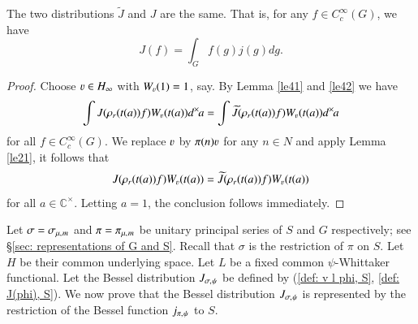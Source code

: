 \documentclass{amsproc}
\newcommand{\BC}{{\mathbb {C}}} \newcommand{\BD}{{\mathbb {D}}}
\def\BCx{\BC^{\times}}
\def\shskip{\hskip 0.5 pt}
\def\dx{d^{\times} \hskip -1 pt}
\theoremstyle{plain}
\numberwithin{equation}{section}
\begin{document}
    \begin{cor}{\label{cor53}}
		The two distributions $\widetilde J $ and $J $ are the same. That is, for any $f\in C_c^\infty(G)$, we have
\[
J (f)=\int_G f(g)j (g)dg.
\]
	\end{cor}
    \begin{proof}
    Choose $\varv\in H_\infty$ with $W_{\varv} (1) = 1$, say. %
    By Lemma \ref{le41} and   \ref{le42} we have
    \[
    \int  J (\rho_r(t(a))f)W_\varv(t(a))\dx  a=\int  \widetilde J (\rho_r(t(a))f)W_\varv(t(a))\dx  a
    \]
    for all $f\in C_c^\infty(G)$. We replace $\varv$ by $\pi(n)\varv$ for any  $n\in N$ and apply Lemma \ref{le21}, it follows that
    \[
    J (\rho_r(t(a))f)W_\varv(t(a))=\widetilde J (\rho_r(t(a))f)W_\varv(t(a))
    \]
    for all $a\in \BCx$. Letting $a = 1$, the conclusion follows immediately.
    \end{proof}

Let $\sigma=\sigma_{\mu, \shskip m}$ and $\pi=\pi_{\mu, \shskip m}$ be unitary principal series of $S$ and $G$ respectively; see \S \ref{sec: representations of G and S}. Recall that $\sigma $ is the restriction of $\pi$ on $S$. Let $H$   be their common underlying space. Let  $L$ be a fixed common $\psi$-Whittaker functional. Let  the  Bessel distribution $J_{\sigma,\shskip \psi}$  be defined by (\ref{def: v l phi, S}, \ref{def: J(phi), S}). We now prove that the  Bessel distribution $J_{\sigma,\shskip \psi}$  is represented by the restriction of the Bessel function $j_{\pi,\shskip \psi}$ to $S$.
	
\end{document}
